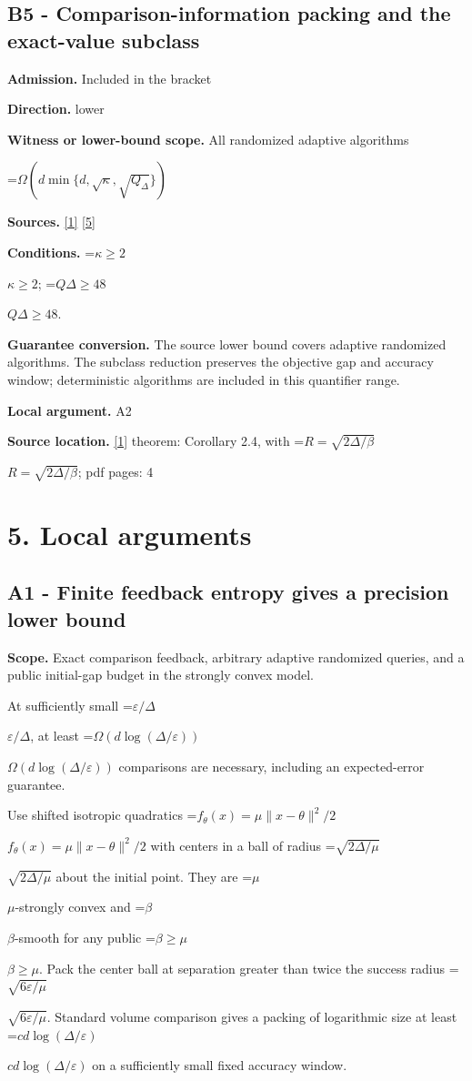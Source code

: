 \documentclass[10pt,a4paper]{article}
\newcommand{\AtlasMath}[1]{\par\begingroup\centering\setbox0=\hbox{$\displaystyle #1$}\ifdim\wd0>1.4\linewidth\typeout{ATLAS WIDE FORMULA: \the\wd0}\fi\ifdim\wd0>\linewidth\resizebox{\linewidth}{!}{\box0}\else\box0\fi\par\endgroup}
\newcommand{\AtlasInlineMath}[1]{\begingroup\setbox0=\hbox{$#1$}\ifdim\wd0>.4\linewidth\endgroup\AtlasMath{#1}\else\endgroup$#1$\fi}
\begin{document}
\subsection{B5 - Comparison-information packing and the exact-value subclass}
\textbf{Admission.} Included in the bracket

\textbf{Direction.} lower

\textbf{Witness or lower-bound scope.} All randomized adaptive algorithms

\AtlasMath{\Omega(d\min\{d,\sqrt\kappa,\sqrt{Q_\Delta}\})}
\textbf{Sources.} \href{https://arxiv.org/html/2610.00345v1}{[1]} \href{https://arxiv.org/html/2610.19652v1}{[5]}

\textbf{Conditions.} \AtlasInlineMath{\kappa \ge 2}; \AtlasInlineMath{Q\Delta \ge 48}.

\textbf{Guarantee conversion.} The source lower bound covers adaptive randomized algorithms. The subclass reduction preserves the objective gap and accuracy window; deterministic algorithms are included in this quantifier range.

\textbf{Local argument.} A2

\textbf{Source location.} \href{https://arxiv.org/html/2610.00345v1}{[1]} theorem: Corollary 2.4, with \AtlasInlineMath{R=\sqrt{2\Delta/\beta}}; pdf pages: 4

\section{5. Local arguments}
\subsection{A1 - Finite feedback entropy gives a precision lower bound}
\textbf{Scope.} Exact comparison feedback, arbitrary adaptive randomized queries, and a public initial-gap budget in the strongly convex model.

At sufficiently small \AtlasInlineMath{\varepsilon/\Delta}, at least \AtlasInlineMath{\Omega(d\log(\Delta/\varepsilon))} comparisons are necessary, including an expected-error guarantee.

Use shifted isotropic quadratics \AtlasInlineMath{f_\theta(x)=\mu\|x-\theta\|^2/2} with centers in a ball of radius \AtlasInlineMath{\sqrt{2\Delta/\mu}} about the initial point. They are \AtlasInlineMath{\mu}-strongly convex and \AtlasInlineMath{\beta}-smooth for any public \AtlasInlineMath{\beta\ge\mu}. Pack the center ball at separation greater than twice the success radius \AtlasInlineMath{\sqrt{6\varepsilon/\mu}}. Standard volume comparison gives a packing of logarithmic size at least \AtlasInlineMath{c d\log(\Delta/\varepsilon)} on a sufficiently small fixed accuracy window.
\end{document}
